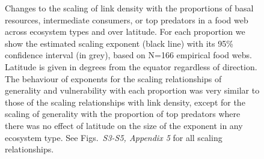 \documentclass[12pt]{article}
\begin{document}
\begin{figure}[!H]
\caption{Changes to the scaling of link density with the proportions of basal resources, intermediate
consumers, or top predators in a food web across ecosystem types and over latitude. For each proportion
we show the estimated scaling exponent (black line) with its 95\% confidence interval (in grey), based
on N=166 empirical food webs. Latitude is given in degrees from the equator regardless of direction. 
The behaviour of exponents for the scaling relationships of generality and vulnerability with each 
proportion was very similar to those of the scaling relationships with link density, except for the 
scaling of generality with the proportion of top predators where there was no effect of latitude on the 
size of the exponent in any ecosystem type. See Figs.~\emph{S3-S5, Appendix 5} for all scaling relationships.}
\label{BIT}
\end{figure}
\end{document}
